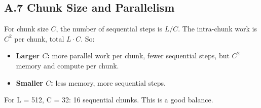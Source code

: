 \subsection{A.7 Chunk Size and Parallelism}

For chunk size $C$, the number of sequential steps is $L / C$. The 
intra-chunk work is $C^2$ per chunk, total $L \cdot C$. So:

\begin{itemize}
\item \textbf{Larger $C$:} more parallel work per chunk, fewer sequential steps, but
  $C^2$ memory and compute per chunk.
\item \textbf{Smaller $C$:} less memory, more sequential steps.

\end{itemize}
For L = 512, C = 32: 16 sequential chunks. This is a good balance.

